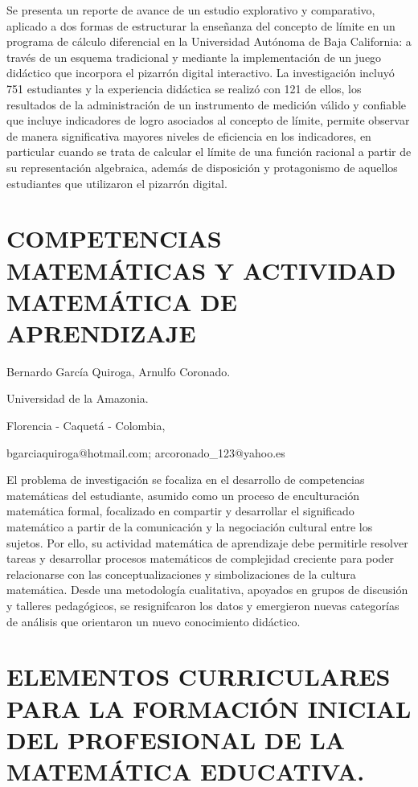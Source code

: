 Se presenta un reporte de avance de un estudio explorativo y comparativo,
aplicado a dos formas de estructurar la enseñanza del concepto de
límite en un programa de cálculo diferencial en la Universidad Autónoma
de Baja California: a través de un esquema tradicional y mediante
la implementación de un juego didáctico que incorpora el pizarrón
digital interactivo. La investigación incluyó 751 estudiantes y la
experiencia didáctica se realizó con 121 de ellos, los resultados
de la administración de un instrumento de medición válido y confiable
que incluye indicadores de logro asociados al concepto de límite,
permite observar de manera significativa mayores niveles de eficiencia
en los indicadores, en particular cuando se trata de calcular el límite
de una función racional a partir de su representación algebraica,
además de disposición y protagonismo de aquellos estudiantes que utilizaron
el pizarrón digital.


\section{COMPETENCIAS MATEMÁTICAS Y ACTIVIDAD MATEMÁTICA DE APRENDIZAJE}

\begin{datos}

Bernardo García Quiroga, Arnulfo Coronado.

Universidad de la Amazonia.

Florencia - Caquetá - Colombia,

bgarciaquiroga@hotmail.com; arcoronado\_123@yahoo.es 

\end{datos}

El problema de investigación se focaliza en el desarrollo de competencias
matemáticas del estudiante, asumido como un proceso de enculturación
matemática formal, focalizado en compartir y desarrollar el significado
matemático a partir de la comunicación y la negociación cultural entre
los sujetos. Por ello, su actividad matemática de aprendizaje debe
permitirle resolver tareas y desarrollar procesos matemáticos de complejidad
creciente para poder relacionarse con las conceptualizaciones y simbolizaciones
de la cultura matemática. Desde una metodología cualitativa, apoyados
en grupos de discusión y talleres pedagógicos, se resignifcaron los
datos y emergieron nuevas categorías de análisis que orientaron un
nuevo conocimiento didáctico.


\section{ELEMENTOS CURRICULARES PARA LA FORMACIÓN INICIAL DEL PROFESIONAL
DE LA MATEMÁTICA EDUCATIVA.}

